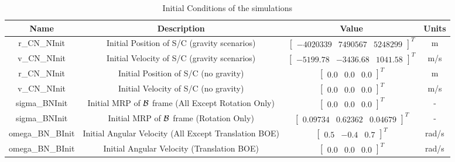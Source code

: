 \begin{table}[htbp]
	\caption{Initial Conditions of the simulations}
	\label{tab:initial}
	\centering \fontsize{10}{10}\selectfont
	\begin{tabular}{ c | c | c | c } %
		\hline
		\textbf{Name}  & \textbf{Description}  & \textbf{Value} & \textbf{Units} \\
		\hline
		r\_CN\_NInit & Initial Position of S/C (gravity scenarios) & $\begin{bmatrix}
		-4020339 &	7490567 & 5248299 
		\end{bmatrix}^T$ & m \\
		v\_CN\_NInit & Initial Velocity of S/C (gravity scenarios) & $\begin{bmatrix}
		-5199.78 & -3436.68 & 1041.58
		\end{bmatrix}^T$ & m/s \\
		r\_CN\_NInit & Initial Position of S/C (no gravity) & $\begin{bmatrix}
		0.0 & 0.0 & 0.0 
		\end{bmatrix}^T$ & m \\
		v\_CN\_NInit & Initial Velocity of S/C (no gravity) & $\begin{bmatrix}
		0.0 & 0.0 & 0.0
		\end{bmatrix}^T$ & m/s \\
		sigma\_BNInit & Initial MRP of $\cal{B}$ frame (All Except Rotation Only) & $\begin{bmatrix}
		0.0 & 0.0 & 0.0
		\end{bmatrix}^T$ & - \\
		sigma\_BNInit & Initial MRP of $\cal{B}$ frame (Rotation Only) & $\begin{bmatrix}
		0.09734 & 0.62362 & 0.04679
		\end{bmatrix}^T$ & - \\
		omega\_BN\_BInit & Initial Angular Velocity (All Except Translation BOE) & $\begin{bmatrix}
		0.5 & -0.4 & 0.7
		\end{bmatrix}^T$ & rad/s \\
		omega\_BN\_BInit & Initial Angular Velocity (Translation BOE) & $\begin{bmatrix}
		0.0 & 0.0 & 0.0
		\end{bmatrix}^T$ & rad/s \\
		\hline
	\end{tabular}
\end{table}

